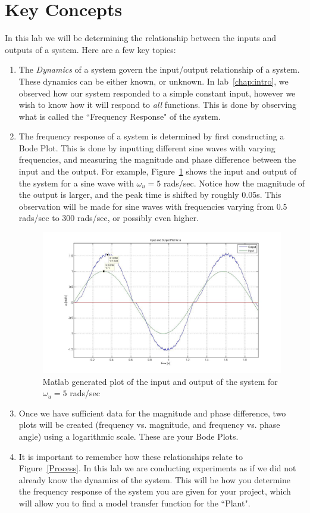 \section{Key Concepts}
In this lab we will be determining the relationship between the inputs and outputs 
of a system. Here are a few key topics:
\begin{enumerate}
\item The \emph{Dynamics} of a system govern the input/output relationship
 of a system. These dynamics can be either known, or unknown. In lab~\ref{chap:intro}, 
we observed how our system responded to a simple constant input, however we wish to know 
how it will respond to \emph{all} functions. This is done by observing what is called the 
``Frequency Response" of the system.
\item The  frequency response of a system is determined by first constructing a Bode Plot.  
This is done by inputting different sine waves with varying frequencies, and measuring 
the magnitude and phase difference between the input and the output. For example, 
Figure~\ref{fig:FreqResp} shows the input and output of the system for a sine wave with 
$\omega_u = 5$ rads/sec. Notice how the  magnitude of the output is larger, and the peak time
is shifted by roughly 0.05s. This observation will be made for sine waves with frequencies varying 
from 0.5 rads/sec to 300 rads/sec, or possibly even higher. 
\begin{figure}[htbp]
\centering
\includegraphics[width=\hsize,height = 0.6\hsize]{pix/FreqResp.jpg}
\caption{\textsf{Matlab} generated plot of the input and output  of the system for $\omega_u = 5$ rads/sec}\label{fig:FreqResp}
\end{figure}

\item Once we have  sufficient data for the magnitude and phase difference, two plots will be created 
(frequency vs. magnitude, and frequency vs. phase angle) using a logarithmic scale. These are your Bode Plots. %
\item It is important to remember how these relationships relate to Figure~\ref{Process}. 
In this lab we are conducting experiments as if we did not already know the dynamics of the system. 
This will be how you determine the frequency response of the system you are given for your project,
which will allow you to find a model transfer function for the ``Plant".  


\end{enumerate}

